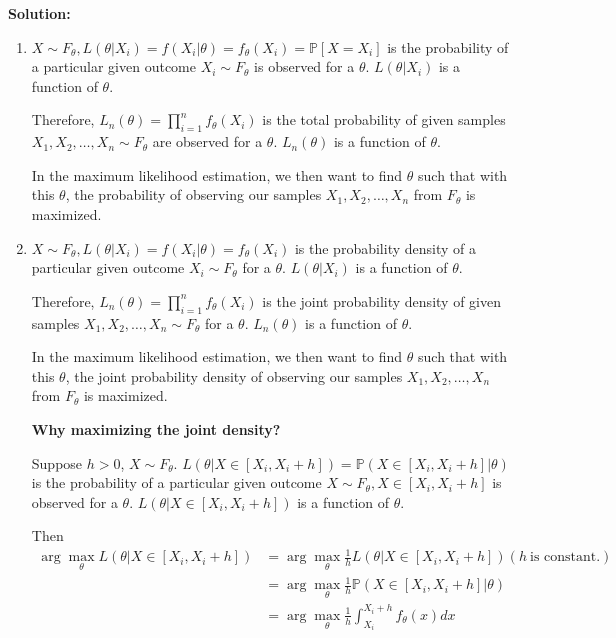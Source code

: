 \documentclass[13pt]{article}
\theoremstyle{definition}
\newenvironment{solution}
{\color{C2}\begin{framed}\begingroup\textbf{Solution:} }
  {\endgroup\end{framed}}
\theoremstyle{remark}
\newcommand{\PP}{\mathbb{P}}
\begin{document}
\begin{solution}
\begin{enumerate}[label=(\alph*),topsep=0pt]
        \item $X\sim F_{\theta}, L(\theta |X_i)=f(X_i|\theta ) = f_{\theta}(X_i) = \PP[X=X_i]$ is the probability of a particular given outcome  $X_i\sim F_{\theta}$ is observed for a $\theta$. $L(\theta |X_i)$ is a function of $\theta$.
        
        Therefore, $L_n(\theta) = \prod_{i=1}^{n} f_\theta(X_i)$ is the total probability of given samples $X_1, X_2, \ldots, X_n\sim F_{\theta}$ are observed for a $\theta$. $L_n(\theta)$ is a function of $\theta$.
        
        In the maximum likelihood estimation, we then want to find $\theta$ such that with this $\theta$, the probability of observing our samples $X_1, X_2, \ldots, X_n$ from $F_{\theta}$ is maximized.
        
        \item $X\sim F_{\theta}, L(\theta |X_i) =f(X_i|\theta )= f_{\theta}(X_i)$ is the probability density of a particular given outcome  $X_i\sim F_{\theta}$ for a $\theta$. $L(\theta |X_i)$ is a function of $\theta$.
        
        Therefore, $L_n(\theta) = \prod_{i=1}^{n} f_\theta(X_i)$ is the joint probability density of given samples $X_1, X_2, \ldots, X_n\sim F_{\theta}$ for a $\theta$. $L_n(\theta)$ is a function of $\theta$.
        
        In the maximum likelihood estimation, we then want to find $\theta$ such that with this $\theta$, the joint probability density of observing our samples $X_1, X_2, \ldots, X_n$ from $F_{\theta}$ is maximized.
        
        \textbf{Why maximizing the joint density?}
        
       Suppose $h>0$, $X\sim F_{\theta}$. $L(\theta |X\in [X_i, X_i+h])=\PP(X\in [X_i, X_i+h]|\theta ) $ is the probability of a particular given outcome  $X\sim F_{\theta}, X\in [X_i, X_i+h]$ is observed for a $\theta$. $L(\theta |X\in [X_i, X_i+h])$ is a function of $\theta$.
       
       Then 
       \begin{align*}
      \arg\max_{\theta} L(\theta |X\in [X_i, X_i+h]) &= \arg\max_{\theta} \frac{1}{h}L(\theta |X\in [X_i, X_i+h]) (h \ \text{is constant}.)\\
      &= \arg\max_{\theta} \frac{1}{h}\PP(X\in [X_i, X_i+h]|\theta )\\
      &= \arg\max_{\theta} \frac{1}{h}\int_{X_i}^{X_i+h} f_{\theta}(x)dx\\     
       \end{align*}
       

\end{enumerate}
\end{solution}
\end{document}

